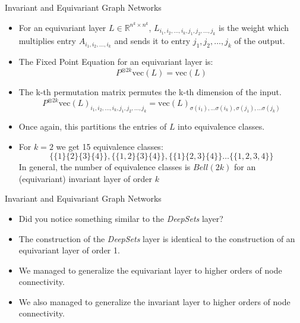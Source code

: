 \documentclass{beamer}
\begin{document}
\begin{frame}{Invariant and Equivariant Graph Networks}
    \small{
        \begin{itemize}
            \setlength{\itemsep}{\fill}
            \item For an equivariant layer $L \in \mathbb{R}^{n^k \times n^k}$, $L_{i_1,i_2,\ldots,i_k, j_1, j_2,\ldots,j_k}$ is the weight which multiplies entry $A_{i_1,i_2,\ldots,i_k}$ 
            and sends it to entry ${j_1,j_2,\ldots,j_k}$ of the output.
            \pause
            \item The Fixed Point Equation for an equivariant layer is:
            \[ P^{\otimes 2k}\text{vec}(L) = \text{vec}(L) \]
            \pause
            \item The k-th permutation matrix permutes the k-th dimension of the input. 
            \[ P^{\otimes 2k}\text{vec}(L)_{i_1,i_2,\ldots,i_k, j_1, j_2,\ldots,j_k} = \text{vec}(L)_{\sigma(i_1), \ldots \sigma(i_k), \sigma(j_1), \ldots \sigma(j_k)} \]
            \pause
            \item Once again, this partitions the entries of $L$ into equivalence classes.
            \pause
            \item For $k=2$ we get 15 equivalence classes:
            \[ \{\{1\} \{2\} \{3\} \{4\}\}, \{\{1, 2\} \{3\} \{4\}\}, \{\{1\} \{2, 3\} \{4\}\} \ldots \{\{1, 2, 3, 4\}\}\]
            \pause
            In general, the number of equivalence classes is $Bell(2k)$ for an (equivariant) invariant layer of order $k$
        \end{itemize}
    }
\end{frame}
\begin{frame}{Invariant and Equivariant Graph Networks}
    \begin{itemize}
        \setlength{\itemsep}{\fill}
        \item Did you notice something similar to the \emph{DeepSets} layer?
        \pause
        \item The construction of the \emph{DeepSets} layer is identical to the construction of an equivariant layer of order 1.
        \pause
        \item We managed to generalize the equivariant layer to higher orders of node connectivity.
        \pause
        \item We also managed to generalize the invariant layer to higher orders of node connectivity.
    \end{itemize}
\end{frame}
\end{document}
